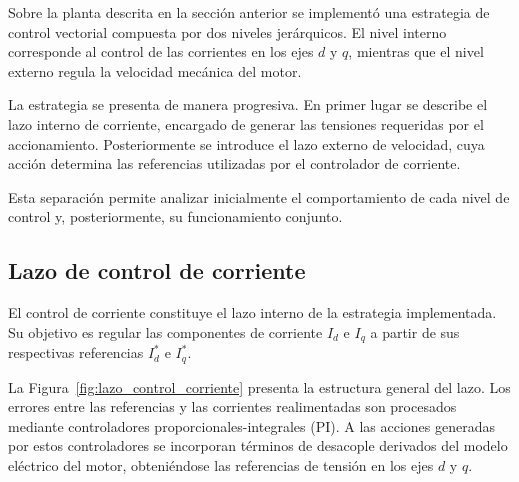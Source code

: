 Sobre la planta descrita en la sección anterior se implementó una
estrategia de control vectorial compuesta por dos niveles jerárquicos.
El nivel interno corresponde al control de las corrientes en los ejes
$d$ y $q$, mientras que el nivel externo regula la velocidad mecánica
del motor.

La estrategia se presenta de manera progresiva. En primer lugar se
describe el lazo interno de corriente, encargado de generar las
tensiones requeridas por el accionamiento. Posteriormente se introduce
el lazo externo de velocidad, cuya acción determina las referencias
utilizadas por el controlador de corriente.

Esta separación permite analizar inicialmente el comportamiento de
cada nivel de control y, posteriormente, su funcionamiento conjunto.


\subsection{Lazo de control de corriente}
\label{subsec:control_corriente}

El control de corriente constituye el lazo interno de la estrategia
implementada. Su objetivo es regular las componentes de corriente
$I_d$ e $I_q$ a partir de sus respectivas referencias $I_d^{*}$ e
$I_q^{*}$.

La Figura~\ref{fig:lazo_control_corriente} presenta la estructura
general del lazo. Los errores entre las referencias y las corrientes
realimentadas son procesados mediante controladores
proporcionales-integrales (PI). A las acciones generadas por estos
controladores se incorporan términos de desacople derivados del modelo
eléctrico del motor, obteniéndose las referencias de tensión en los
ejes $d$ y $q$.

